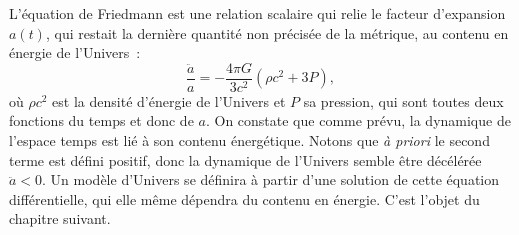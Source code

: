 L'équation de Friedmann est une relation scalaire qui relie le facteur d'expansion $a(t)$, qui restait la dernière quantité non précisée de la métrique, au contenu en énergie de l'Univers~:
\begin{equation}
\frac{\ddot a}{a}=-\frac{4\pi G}{3c^2}(\rho c^2 +3 P),
\label{e:friedmann}
\end{equation}
où $\rho c^2$ est la densité d'énergie de l'Univers et $P$ sa pression, qui sont toutes deux fonctions du temps et donc de $a$. On constate que comme prévu, la dynamique de l'espace temps est lié à son contenu énergétique. Notons que \textit{à priori} le second terme est défini positif, donc la dynamique de l'Univers semble être décélérée $\ddot a<0$. Un modèle d'Univers se définira à partir d'une solution de cette équation différentielle, qui elle même dépendra du contenu en énergie. C'est l'objet du chapitre suivant.